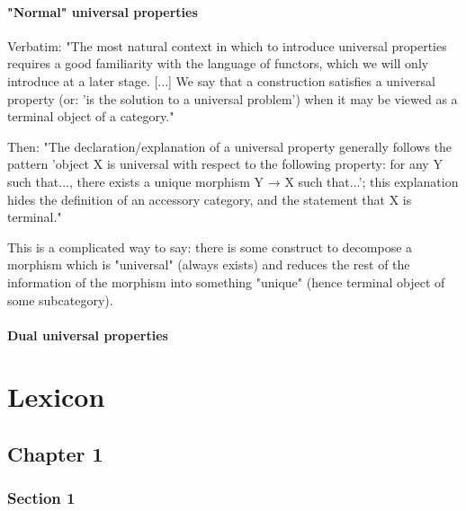 \documentclass[12pt, letterpaper, twoside]{report}
\begin{document}
\subsection*{"Normal" universal properties}

Verbatim: "The most natural context in which to introduce universal properties requires a good familiarity with the language of functors, which we will only introduce at a later stage. [...] We say that a construction satisﬁes a universal property (or: 'is the solution to a universal problem') when it may be viewed as a terminal object of a category."

Then: "The declaration/explanation of a universal property generally follows the pattern 'object X is universal with respect to the following property: for any Y such that..., there exists a unique morphism Y → X such that...'; this explanation hides the deﬁnition of an accessory category, and the statement that X is terminal."

This is a complicated way to say: there is some construct to decompose a morphism which is "universal" (always exists) and reduces the rest of the information of the morphism into something "unique" (hence terminal object of some subcategory).


\subsection*{Dual universal properties}

\newpage
\part{Lexicon}
\chapter*{Chapter 1}

\section*{Section 1}
\end{document}
